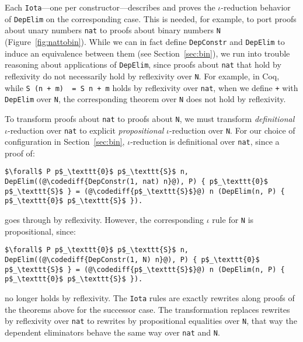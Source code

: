 Each \lstinline{Iota}---one per constructor---describes and proves the $\iota$-reduction behavior
of \lstinline{DepElim} on the corresponding case.
This is needed, for example, to port proofs about unary numbers \lstinline{nat} to
proofs about binary numbers \lstinline{N} (Figure~\ref{fig:nattobin}).
While we can in fact define \lstinline{DepConstr} and \lstinline{DepElim} to induce an equivalence
between them (see Section~\ref{sec:bin}), we run into trouble reasoning about applications of \lstinline{DepElim},
since proofs about \lstinline{nat} that hold by reflexivity do not necessarily hold by reflexivity over \lstinline{N}. 
For example, in Coq, while \lstinline{S (n + m)  = S n + m} holds by reflexivity over \lstinline{nat},
when we define \lstinline{+} with \lstinline{DepElim} over \lstinline{N},
the corresponding theorem over \lstinline{N} does not hold by reflexivity.

To transform proofs about \lstinline{nat} to proofs about \lstinline{N}, we must transform \textit{definitional} $\iota$-reduction over \lstinline{nat} to explicit \textit{propositional} $\iota$-reduction over \lstinline{N}.
For our choice of configuration in Section~\ref{sec:bin},
$\iota$-reduction is definitional over \lstinline{nat}, since a proof of:

\begin{lstlisting}
$\forall$ P p$_\texttt{0}$ p$_\texttt{S}$ n, DepElim((@\codediff{DepConstr(1, nat) n}@), P) { p$_\texttt{0}$ p$_\texttt{S}$ } = (@\codediff{p$_\texttt{S}$}@) n (DepElim(n, P) { p$_\texttt{0}$ p$_\texttt{S}$ }).
\end{lstlisting}
goes through by reflexivity.
However, the corresponding $\iota$ rule for \lstinline{N} is propositional, since:

\begin{lstlisting}
$\forall$ P p$_\texttt{0}$ p$_\texttt{S}$ n, DepElim((@\codediff{DepConstr(1, N) n}@), P) { p$_\texttt{0}$ p$_\texttt{S}$ } = (@\codediff{p$_\texttt{S}$}@) n (DepElim(n, P) { p$_\texttt{0}$ p$_\texttt{S}$ }).
\end{lstlisting}
no longer holds by reflexivity.
The \lstinline{Iota} rules are exactly rewrites along proofs of the theorems above for the successor case.
The transformation replaces rewrites by reflexivity over \lstinline{nat} to rewrites by propositional equalities over \lstinline{N},
that way the dependent eliminators behave the same way over \lstinline{nat} and \lstinline{N}.

